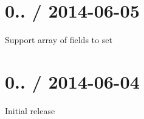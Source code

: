 \section*{0.. / 2014-\/06-\/05 }


\begin{DoxyItemize}
\item Support array of fields to set
\end{DoxyItemize}

\section*{0.. / 2014-\/06-\/04 }


\begin{DoxyItemize}
\item Initial release 
\end{DoxyItemize}